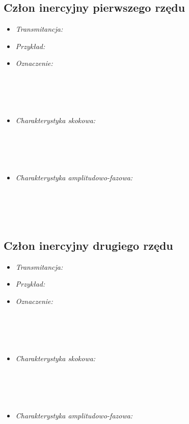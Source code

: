 \documentclass[a4paper]{article}
\begin{document}
\subsection{Człon inercyjny pierwszego rzędu}
\begin{itemize}
\item \emph{Transmitancja: }
\item \emph{Przykład: }
\item \emph {Oznaczenie: } \\\\\\\\\\
\item \emph{Charakterystyka skokowa: } \\\\\\\\\\
\item \emph{Charakterystyka amplitudowo-fazowa: } \\\\\\\\\\
\end{itemize}
\subsection{Człon inercyjny drugiego rzędu}
\begin{itemize}
\item \emph{Transmitancja: }
\item \emph{Przykład: }
\item \emph {Oznaczenie: } \\\\\\\\\\
\item \emph{Charakterystyka skokowa: } \\\\\\\\\\
\item \emph{Charakterystyka amplitudowo-fazowa: } \\\\\\\\\\
\end{itemize}
\end{document}
